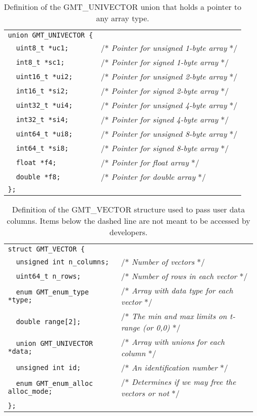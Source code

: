 \documentclass[11pt]{report}
\begin{document}
\begin{table}[h]
\small
\centering
\begin{tabular}{ll} \hline
\verb!union GMT_UNIVECTOR {! & \\
\verb!  uint8_t *uc1;!  & /* \emph{Pointer for unsigned 1-byte array} */ \\
\verb!  int8_t *sc1;!   & /* \emph{Pointer for signed 1-byte array} */ \\
\verb!  uint16_t *ui2;! & /* \emph{Pointer for unsigned 2-byte array} */ \\
\verb!  int16_t *si2;!  & /* \emph{Pointer for signed 2-byte array} */ \\
\verb!  uint32_t *ui4;! & /* \emph{Pointer for unsigned 4-byte array} */ \\
\verb!  int32_t *si4;!  & /* \emph{Pointer for signed 4-byte array} */ \\
\verb!  uint64_t *ui8;! & /* \emph{Pointer for unsigned 8-byte array} */ \\
\verb!  int64_t *si8;!  & /* \emph{Pointer for signed 8-byte array} */ \\
\verb!  float *f4;!     & /* \emph{Pointer for float array} */ \\
\verb!  double *f8;!    & /* \emph{Pointer for double array} */ \\
\verb!};!               & \\
\hline
\end{tabular}
\caption{Definition of the GMT\_UNIVECTOR union that holds a pointer to any array type.}
\label{tbl:univector}
\end{table}

\begin{table}[h]
\small
\centering
\begin{tabular}{ll} \hline
\verb!struct GMT_VECTOR {!               & \\
\verb!  unsigned int n_columns;!         & /* \emph{Number of vectors} */\\
\verb!  uint64_t n_rows;!                & /* \emph{Number of rows in each vector} */ \\
\verb!  enum GMT_enum_type *type;!       & /* \emph{Array with data type for each vector} */\\
\verb!  double range[2];!                & /* \emph{The min and max limits on t-range (or 0,0) } */\\
\verb!  union GMT_UNIVECTOR *data;!      & /* \emph{Array with unions for each column} */\\ \hdashline
\verb!  unsigned int id;!                & /* \emph{An identification number} */ \\
\verb!  enum GMT_enum_alloc alloc_mode;! & /* \emph{Determines if we may free the vectors or not} */\\
\verb!};!                                & \\
\hline
\end{tabular}
\caption{Definition of the GMT\_VECTOR structure used to pass user data columns.  Items below the dashed
line are not meant to be accessed by developers.}
\label{tbl:vector}
\end{table}
\noindent
\end{document}
